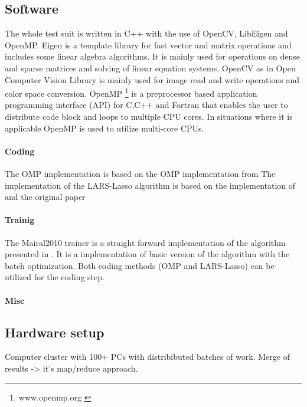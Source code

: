 \subsection*{Software}
The whole test suit is written in C++ with the use of OpenCV, LibEigen and OpenMP.
Eigen \cite{Eigen} is a template library for fast vector and matrix operations and includes some linear algebra algorithms.
It is mainly used for operations on dense and sparse matrices and solving of linear equation systems.
OpenCV \cite{OpenCV} as in Open Computer Vision Library is mainly used for image read and write operations and color space conversion.
OpenMP \footnote{www.openmp.org \cite{OpenMP}} is a preprocessor based application programming interface (API) for C,C++ and Fortran that enables 
the user to distribute code block and loops to multiple CPU cores. 
In situations where it is applicable OpenMP is used to utilize multi-core CPUs. 

\paragraph{Coding}
The OMP implementation is based on the OMP implementation from \cite{Rubinstein}
The implementation of the LARS-Lasso algorithm is based on the implementation of \cite{Strand2005} and the original paper \cite{Efron2004}

\paragraph{Trainig}
The Mairal2010 trainer is a straight forward implementation of the algorithm presented in \cite{Mairal2010}.
It is a implementation of basic version of the algorithm with the batch optimization. 
Both coding methods (OMP and LARS-Lasso) can be utilized for the coding step.

\paragraph{Misc}


\subsection*{Hardware setup}
Computer cluster with 100+ PCs with distribibuted batches of work.
Merge of results -> it's  map/reduce approach.


